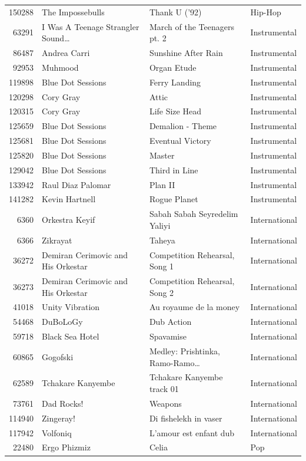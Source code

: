 \begin{footnotesize}
\begin{longtable}{@{}rlll@{}}
150288 & The Impossebulls & Thank U ('92) & Hip-Hop \\
63291 & I Was A Teenage Strangler Sound\ldots & March of the Teenagers pt. 2 & Instrumental \\
86487 & Andrea Carri & Sunshine After Rain & Instrumental \\
92953 & Muhmood & Organ Etude & Instrumental \\
119898 & Blue Dot Sessions & Ferry Landing & Instrumental \\
120298 & Cory Gray & Attic & Instrumental \\
120315 & Cory Gray & Life Size Head & Instrumental \\
125659 & Blue Dot Sessions & Demalion - Theme & Instrumental \\
125681 & Blue Dot Sessions & Eventual Victory & Instrumental \\
125820 & Blue Dot Sessions & Master & Instrumental \\
129042 & Blue Dot Sessions & Third in Line & Instrumental \\
133942 & Raul Diaz Palomar & Plan II & Instrumental \\
141282 & Kevin Hartnell & Rogue Planet & Instrumental \\
6360 & Orkestra Keyif & Sabah Sabah Seyredelim Yaliyi & International \\
6366 & Zikrayat & Taheya & International \\
36272 & Demiran Cerimovic and His Orkestar & Competition Rehearsal, Song 1 & International \\
36273 & Demiran Cerimovic and His Orkestar & Competition Rehearsal, Song 2 & International \\
41018 & Unity Vibration & Au royaume de la money & International \\
54468 & DuBoLoGy & Dub Action & International \\
59718 & Black Sea Hotel & Spavamise & International \\
60865 & Gogofski & Medley: Prishtinka, Ramo-Ramo\ldots & International \\
62589 & Tchakare Kanyembe & Tchakare Kanyembe track 01 & International \\
73761 & Dad Rocks! & Weapons & International \\
114940 & Zingeray! & Di fishelekh in vaser & International \\
117942 & Volfoniq & L'amour est enfant dub & International \\
22480 & Ergo Phizmiz & Celia & Pop \\

\end{longtable}
\end{footnotesize}
